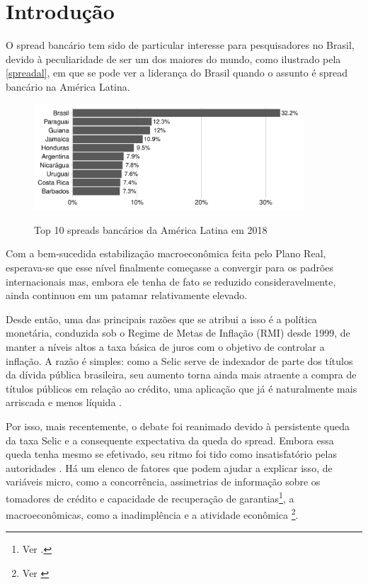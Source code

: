 \documentclass[a4paper,
               article,
               12pt,
               openany,
               oneside,
               english,
               brazil]{abntex2}
\numberwithin{equation}{section}
\begin{document}
\textual

\pagestyle{fancy}
\renewcommand{\headrulewidth}{0pt}

\section{Introdução}

    O spread bancário tem sido de particular interesse para pesquisadores no Brasil, devido à peculiaridade de ser um dos maiores do mundo, como ilustrado pela \autoref{spreadal}, em que se pode ver a liderança do Brasil quando o assunto é spread bancário na América Latina.

    \begin{figure}[h]
        \centering
        \caption{Top 10 spreads bancários da América Latina em 2018}
        \includegraphics[width = 0.9\textwidth, scale=1]{spread_AL.pdf}
        \label{spreadal}
    \end{figure}

    Com a bem-sucedida estabilização macroeconômica feita pelo Plano Real, esperava-se que esse nível finalmente começasse a convergir para os padrões internacionais mas, embora ele tenha de fato se reduzido consideravelmente, ainda continuou em um patamar relativamente elevado.

    Desde então, uma das principais razões que se atribui a isso é a política monetária, conduzida sob o Regime de Metas de Inflação (RMI) desde 1999, de manter a níveis altos a taxa básica de juros com o objetivo de controlar a inflação. A razão é simples: como a Selic serve de indexador de parte dos títulos da dívida pública brasileira, seu aumento torna ainda mais atraente a compra de títulos públicos em relação ao crédito, uma aplicação que já é naturalmente mais arriscada e menos líquida \cite[p.~7]{manhica12}.
    
    Por isso, mais recentemente, o debate foi reanimado devido à persistente queda da taxa Selic e a consequente expectativa da queda do spread. Embora essa queda tenha mesmo se efetivado, seu ritmo foi tido como insatisfatório pelas autoridades \cite{valor1}. Há um elenco de fatores que podem ajudar a explicar isso, de variáveis micro, como a concorrência, assimetrias de informação sobre os tomadores de crédito e capacidade de recuperação de garantias\footnote{Ver \cite[p.~13]{reb2018}.}, a macroeconômicas, como a inadimplência e a atividade econômica \footnote{Ver \cite{valor2}}.
    
\end{document}
